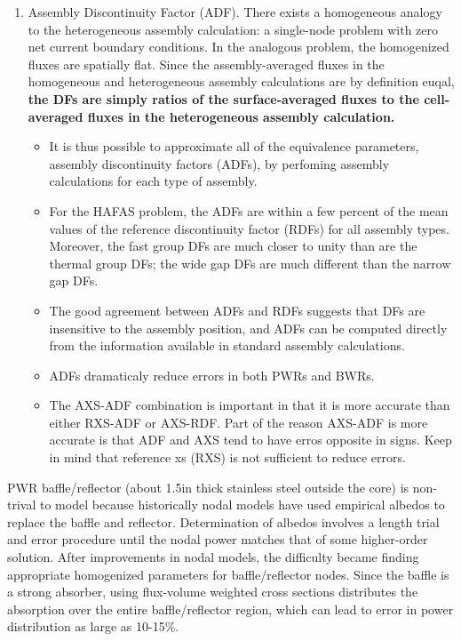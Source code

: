 \documentclass{school-22.211-notes}
\begin{document}
\begin{enumerate}
\item Assembly Discontinuity Factor (ADF). There exists a homogeneous analogy to the heterogeneous assembly calculation: a single-node problem with zero net current boundary conditions. In the analogous problem, the homogenized fluxes are spatially flat. Since the assembly-averaged fluxes in the homogeneous and heterogeneous assembly calculations are by definition euqal, \textbf{the DFs are simply ratios of the surface-averaged fluxes to the cell-averaged fluxes in the heterogeneous assembly calculation.} 
  \begin{itemize}
  \item It is thus possible to approximate all of the equivalence parameters, assembly discontinuity factors (ADFs), by perfoming assembly calculations for each type of assembly. 
  \item For the HAFAS problem, the ADFs are within a few percent of the mean values of the reference discontinuity factor (RDFs) for all assembly types. Moreover, the fast group DFs are much closer to unity than are the thermal group DFs; the wide gap DFs are much different than the narrow gap DFs. 
  \item The good agreement between ADFs and RDFs suggests that DFs are insensitive to the assembly position, and ADFs can be computed directly from the information available in standard assembly calculations. 
  \item ADFs dramaticaly reduce errors in both PWRs and BWRs. 
  \item The AXS-ADF combination is important in that it is more accurate than either RXS-ADF or AXS-RDF. Part of the reason AXS-ADF is more accurate is that ADF and AXS tend to have erros opposite in signs. Keep in mind that reference xs (RXS) is not sufficient to reduce errors. 
  \end{itemize}
\end{enumerate}

\clearpage
{}
PWR baffle/reflector (about 1.5in thick stainless steel outside the core) is non-trival to model because historically nodal models have used empirical albedos to replace the baffle and reflector. Determination of albedos involves a length trial and error procedure until the nodal power matches that of some higher-order solution. After improvements in nodal models, the difficulty became finding appropriate homogenized parameters for baffle/reflector nodes. Since the baffle is a strong absorber, using flux-volume weighted cross sections distributes the absorption over the entire baffle/reflector region, which can lead to error in power distribution as large as 10-15\%. 
\end{document}
